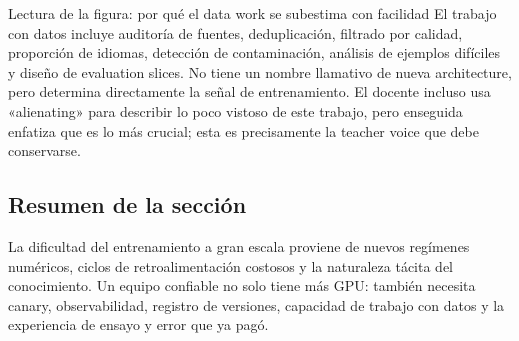 
\begin{knowledgebox}{Lectura de la figura: por qué el data work se subestima con facilidad}
El trabajo con datos incluye auditoría de fuentes, deduplicación, filtrado por calidad, proporción de idiomas, detección de contaminación, análisis de ejemplos difíciles y diseño de evaluation slices. No tiene un nombre llamativo de nueva architecture, pero determina directamente la señal de entrenamiento. El docente incluso usa «alienating» para describir lo poco vistoso de este trabajo, pero enseguida enfatiza que es lo más crucial; esta es precisamente la teacher voice que debe conservarse.
\end{knowledgebox}


\subsection{Resumen de la sección}

La dificultad del entrenamiento a gran escala proviene de nuevos regímenes numéricos, ciclos de retroalimentación costosos y la naturaleza tácita del conocimiento. Un equipo confiable no solo tiene más GPU: también necesita canary, observabilidad, registro de versiones, capacidad de trabajo con datos y la experiencia de ensayo y error que ya pagó.

